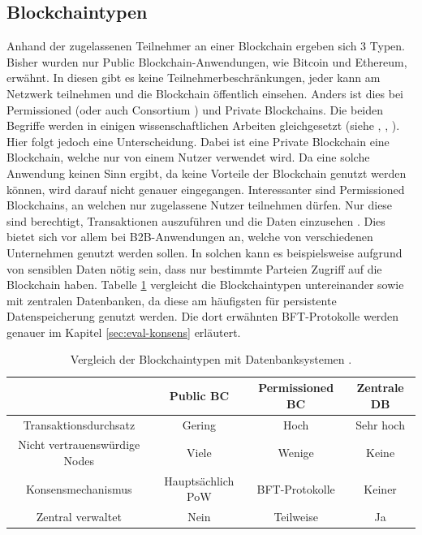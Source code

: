 \subsection{Blockchaintypen}
Anhand der zugelassenen Teilnehmer an einer Blockchain ergeben sich 3 Typen. Bisher wurden nur Public Blockchain-Anwendungen, wie Bitcoin und Ethereum, erwähnt. In diesen gibt es keine Teilnehmerbeschränkungen, jeder kann am Netzwerk teilnehmen und die Blockchain öffentlich einsehen. Anders ist dies bei Permissioned (oder auch Consortium \cite{BenHamidaBlockchainEnterpriseOverview2017}) und Private Blockchains. Die beiden Begriffe werden in einigen wissenschaftlichen Arbeiten gleichgesetzt (siehe \cite{Gramolidangerprivateblockchains2016}, \cite{PongnumkulPerformanceAnalysisPrivate2017}, \cite{LiScalablePrivateIndustrial2017}). Hier folgt jedoch eine Unterscheidung. Dabei ist eine Private Blockchain eine Blockchain, welche nur von einem Nutzer verwendet wird. Da eine solche Anwendung keinen Sinn ergibt, da keine Vorteile der Blockchain genutzt werden können, wird darauf nicht genauer eingegangen. Interessanter sind Permissioned Blockchains, an welchen nur zugelassene Nutzer teilnehmen dürfen. Nur diese sind berechtigt, Transaktionen auszuführen und die Daten einzusehen \cite{LiScalablePrivateIndustrial2017}. Dies bietet sich vor allem bei B2B-Anwendungen an, welche von verschiedenen Unternehmen genutzt werden sollen. In solchen kann es beispielsweise aufgrund von sensiblen Daten nötig sein, dass nur bestimmte Parteien Zugriff auf die Blockchain haben. Tabelle \ref{tab:bc-comparison} vergleicht die Blockchaintypen untereinander sowie mit zentralen Datenbanken, da diese am häufigsten für persistente Datenspeicherung genutzt werden. Die dort erwähnten \acs{BFT}-Protokolle werden genauer im Kapitel \ref{sec:eval-konsens} erläutert.

\begin{table}[h]
    \centering
	\begin{tabular}{c c c c}
	\textbf{} & \textbf{Public BC} & \textbf{Permissioned BC}  & \textbf{Zentrale DB} \\ \hline
	Transaktionsdurchsatz & Gering & Hoch & Sehr hoch \\ \hline
    Nicht vertrauenswürdige Nodes & Viele & Wenige & Keine \\ \hline
    Konsensmechanismus & Hauptsächlich \acs{PoW} & \acs{BFT}-Protokolle & Keiner \\ \hline
    Zentral verwaltet & Nein & Teilweise & Ja \\
    \end{tabular}
    \caption{Vergleich der Blockchaintypen mit Datenbanksystemen \cite{WustyouneedBlockchain2017}\cite{ZhengBlockchainChallengesOpportunities2017}.}
	\label{tab:bc-comparison}
\end{table}

